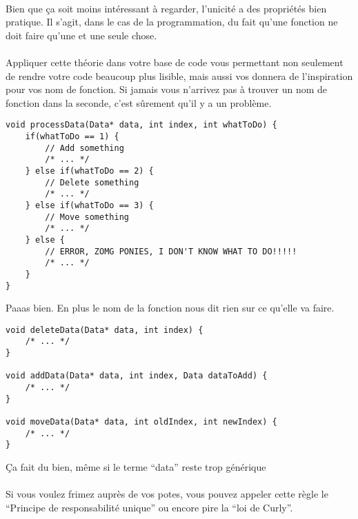 \paragraph{} Bien que ça soit moins intéressant à regarder, l'unicité a des
propriétés bien pratique. Il s'agit, dans le cas de la programmation, du fait
qu'une fonction ne doit faire qu'une et une seule chose.

\paragraph{} Appliquer cette théorie dans votre base de code vous permettant
non seulement de rendre votre code beaucoup plus lisible, mais aussi vos
donnera de l'inspiration pour vos nom de fonction. Si jamais vous n'arrivez pas
à trouver un nom de fonction dans la seconde, c'est sûrement qu'il y a un
problème.

\begin{listing}[H]
	\centering
	\begin{verbatim}
void processData(Data* data, int index, int whatToDo) {
	if(whatToDo == 1) {
		// Add something
		/* ... */
	} else if(whatToDo == 2) {
		// Delete something
		/* ... */
	} else if(whatToDo == 3) {
		// Move something
		/* ... */
	} else {
		// ERROR, ZOMG PONIES, I DON'T KNOW WHAT TO DO!!!!!
		/* ... */
	}
}
	\end{verbatim}
	\caption{Paaas bien. En plus le nom de la fonction nous dit rien sur ce
		qu'elle va faire.}
\end{listing}

\begin{listing}[H]
	\centering
	\begin{verbatim}
void deleteData(Data* data, int index) {
	/* ... */
}

void addData(Data* data, int index, Data dataToAdd) {
	/* ... */
}

void moveData(Data* data, int oldIndex, int newIndex) {
	/* ... */
}
	\end{verbatim}
	\caption{Ça fait du bien, même si le terme ``data'' reste trop générique}
\end{listing}

\paragraph{} Si vous voulez frimez auprès de vos potes, vous pouvez appeler
cette règle le ``Principe de responsabilité unique'' ou encore pire la ``loi de
Curly''.


